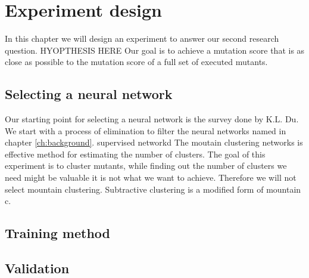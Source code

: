 \documentclass[../../main]{subfiles}
\begin{document}
\clearpage
\section{Experiment design}
In this chapter we will design an experiment to answer our second research question.
HYOPTHESIS HERE
Our goal is to achieve a mutation score that is as close as possible to the mutation score of a full set of executed mutants.
\newline
{}

\subsection{Selecting a neural network}
Our starting point for selecting a neural network is the survey done by K.L. Du\cite{Du2010Clustering:Approach}.
We start with a process of elimination to filter the neural networks named in chapter \ref{ch:background}.
\newline
supervised networkd
\newline
The moutain clustering networks is effective method for estimating the number of clusters\cite{Du2010Clustering:Approach}. 
The goal of this experiment is to cluster mutants, while finding out the number of clusters we need might be valuable it is not what we want to achieve. Therefore we will not select mountain clustering.
Subtractive clustering is a modified form of mountain c\cite{Du2010Clustering:Approach}. 
\newline

\subsection{Training method}

\subsection{Validation}
\end{document}
